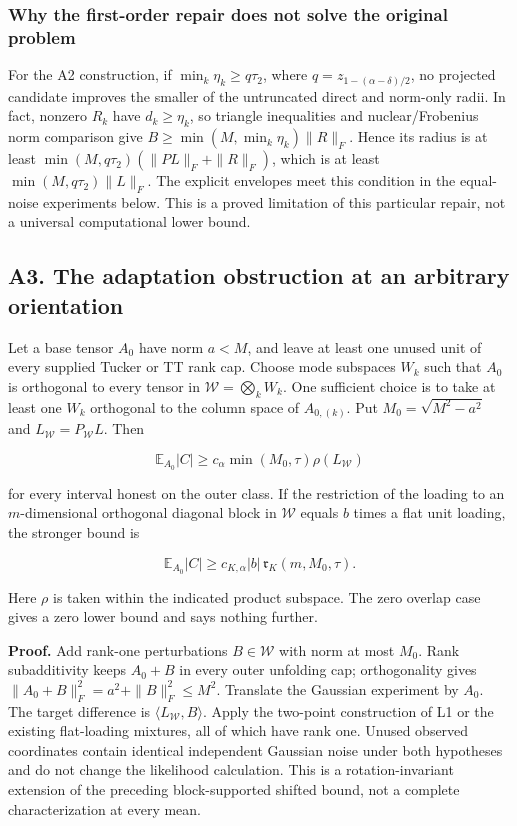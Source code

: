 \documentclass[
  10pt,
]{article}
\begin{document}
\subsubsection{Why the first-order repair does not solve the original
problem}\label{why-the-first-order-repair-does-not-solve-the-original-problem}

For the A2 construction, if \(\min_k\eta_k\ge q\tau_2\), where
\(q=z_{1-(\alpha-\delta)/2}\), no projected candidate improves the
smaller of the untruncated direct and norm-only radii. In fact, nonzero
\(R_k\) have \(d_k\ge\eta_k\), so triangle inequalities and
nuclear/Frobenius norm comparison give
\(B\ge\min(M,\min_k\eta_k)\|R\|_F\). Hence its radius is at least
\(\min(M,q\tau_2)(\|PL\|_F+\|R\|_F)\), which is at least
\(\min(M,q\tau_2)\|L\|_F\). The explicit envelopes meet this condition
in the equal-noise experiments below. This is a proved limitation of
this particular repair, not a universal computational lower bound.

\subsection{A3. The adaptation obstruction at an arbitrary
orientation}\label{a3.-the-adaptation-obstruction-at-an-arbitrary-orientation}

Let a base tensor \(A_0\) have norm \(a<M\), and leave at least one
unused unit of every supplied Tucker or TT rank cap. Choose mode
subspaces \(W_k\) such that \(A_0\) is orthogonal to every tensor in
\(\mathcal W=\bigotimes_k W_k\). One sufficient choice is to take at
least one \(W_k\) orthogonal to the column space of \(A_{0,(k)}\). Put
\(M_0=\sqrt{M^2-a^2}\) and \(L_{\mathcal W}=P_{\mathcal W}L\). Then

\[\mathbb E_{A_0}|C|\ge c_\alpha\min(M_0,\tau)\rho(L_{\mathcal W})\]

for every interval honest on the outer class. If the restriction of the
loading to an \(m\)-dimensional orthogonal diagonal block in
\(\mathcal W\) equals \(b\) times a flat unit loading, the stronger
bound is

\[\mathbb E_{A_0}|C|\ge c_{K,\alpha}|b|\,
\mathfrak r_K(m,M_0,\tau).\]

Here \(\rho\) is taken within the indicated product subspace. The zero
overlap case gives a zero lower bound and says nothing further.

\textbf{Proof.} Add rank-one perturbations \(B\in\mathcal W\) with norm
at most \(M_0\). Rank subadditivity keeps \(A_0+B\) in every outer
unfolding cap; orthogonality gives
\(\|A_0+B\|_F^2=a^2+\|B\|_F^2\le M^2\). Translate the Gaussian
experiment by \(A_0\). The target difference is
\(\langle L_{\mathcal W},B\rangle\). Apply the two-point construction of
L1 or the existing flat-loading mixtures, all of which have rank one.
Unused observed coordinates contain identical independent Gaussian noise
under both hypotheses and do not change the likelihood calculation. This
is a rotation-invariant extension of the preceding block-supported
shifted bound, not a complete characterization at every mean.
\end{document}
